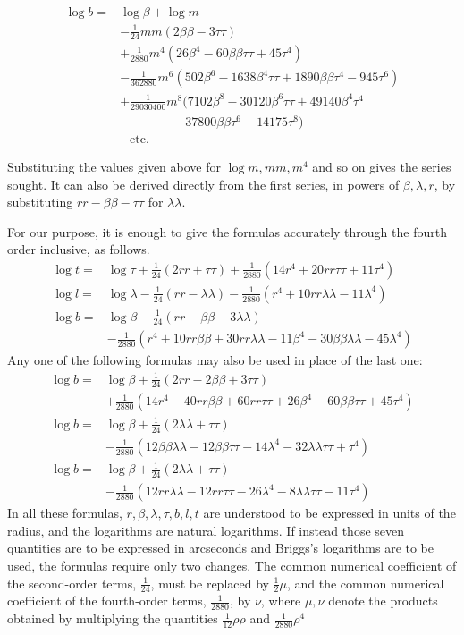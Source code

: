 \[
\begin{aligned}
\log b={}&\log\beta+\log m\\
&-\tfrac1{24}mm(2\beta\beta-3\tau\tau)\\
&+\tfrac1{2880}m^4(26\beta^4-60\beta\beta\tau\tau+45\tau^4)\\
&-\tfrac1{362880}m^6(502\beta^6-1638\beta^4\tau\tau+1890\beta\beta\tau^4-945\tau^6)\\
&+\tfrac1{29030400}m^8(7102\beta^8-30120\beta^6\tau\tau+49140\beta^4\tau^4\\
&\qquad\qquad-37800\beta\beta\tau^6+14175\tau^8)\\
&-\text{etc.}
\end{aligned}
\]

\indent Substituting the values given above for \(\log m,mm,m^4\) and so on gives the series sought. It can also be derived directly from the first series, in powers of \(\beta,\lambda,r\), by substituting \(rr-\beta\beta-\tau\tau\) for \(\lambda\lambda\).

For our purpose, it is enough to give the formulas accurately through the fourth order inclusive, as follows.
\[
\begin{aligned}
\log t={}&\log\tau+\tfrac1{24}(2rr+\tau\tau)+\tfrac1{2880}(14r^4+20rr\tau\tau+11\tau^4)\\
\log l={}&\log\lambda-\tfrac1{24}(rr-\lambda\lambda)-\tfrac1{2880}(r^4+10rr\lambda\lambda-11\lambda^4)\\
\log b={}&\log\beta-\tfrac1{24}(rr-\beta\beta-3\lambda\lambda)\\
&-\tfrac1{2880}(r^4+10rr\beta\beta+30rr\lambda\lambda-11\beta^4-30\beta\beta\lambda\lambda-45\lambda^4)
\end{aligned}
\]
Any one of the following formulas may also be used in place of the last one:
\[
\begin{aligned}
\log b={}&\log\beta+\tfrac1{24}(2rr-2\beta\beta+3\tau\tau)\\
&+\tfrac1{2880}(14r^4-40rr\beta\beta+60rr\tau\tau+26\beta^4-60\beta\beta\tau\tau+45\tau^4)\\
\log b={}&\log\beta+\tfrac1{24}(2\lambda\lambda+\tau\tau)\\
&-\tfrac1{2880}(12\beta\beta\lambda\lambda-12\beta\beta\tau\tau-14\lambda^4-32\lambda\lambda\tau\tau+\tau^4)\\
\log b={}&\log\beta+\tfrac1{24}(2\lambda\lambda+\tau\tau)\\
&-\tfrac1{2880}(12rr\lambda\lambda-12rr\tau\tau-26\lambda^4-8\lambda\lambda\tau\tau-11\tau^4)
\end{aligned}
\]
In all these formulas, \(r,\beta,\lambda,\tau,b,l,t\) are understood to be expressed in units of the radius, and the logarithms are natural logarithms. If instead those seven quantities are to be expressed in arcseconds and Briggs's logarithms are to be used, the formulas require only two changes. The common numerical coefficient of the second-order terms, \(\frac1{24}\), must be replaced by \(\frac12\mu\), and the common numerical coefficient of the fourth-order terms, \(\frac1{2880}\), by \(\nu\), where \(\mu,\nu\) denote the products obtained by multiplying the quantities \(\frac1{12}\rho\rho\) and \(\frac1{2880}\rho^4\)
